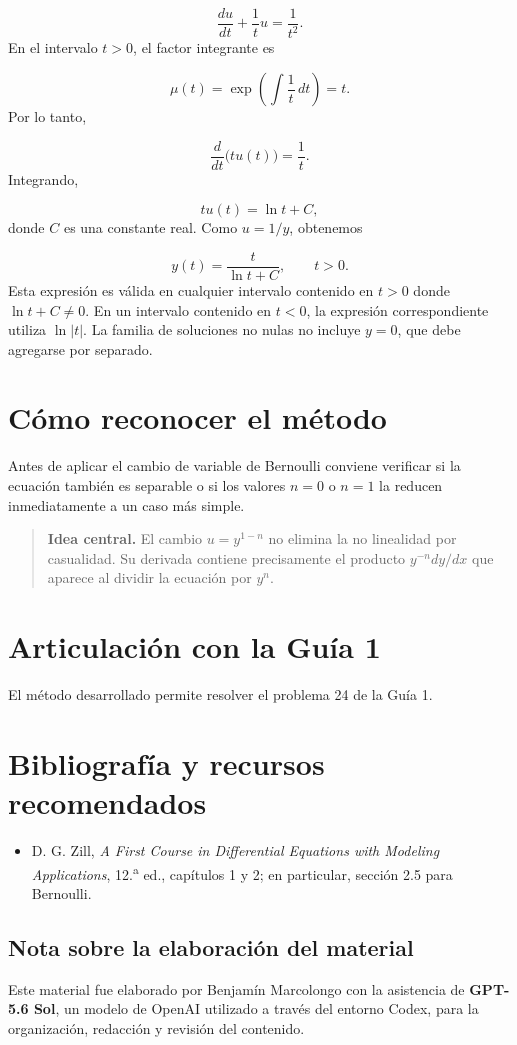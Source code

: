 \documentclass[12pt,a4paper]{article}
\begin{document}
	\[
	\frac{du}{dt}+\frac{1}{t}u=\frac{1}{t^2}.
	\]
	En el intervalo \(t>0\), el factor integrante es

	\[
	\mu(t)=\exp\left(\int\frac{1}{t}\,dt\right)=t.
	\]
	Por lo tanto,

	\[
	\frac{d}{dt}\bigl(tu(t)\bigr)=\frac{1}{t}.
	\]
	Integrando,

	\[
	tu(t)=\ln t+C,
	\]
	donde \(C\) es una constante real. Como \(u=1/y\), obtenemos

	\[
	\boxed{
	y(t)=\frac{t}{\ln t+C},
	\qquad t>0.
	}
	\]
	Esta expresión es válida en cualquier intervalo contenido en \(t>0\) donde \(\ln t+C\neq0\). En un intervalo contenido en \(t<0\), la expresión correspondiente utiliza \(\ln|t|\). La familia de soluciones no nulas no incluye \(y=0\), que debe agregarse por separado.

	\section{Cómo reconocer el método}

	Antes de aplicar el cambio de variable de Bernoulli conviene verificar si la ecuación también es separable o si los valores \(n=0\) o \(n=1\) la reducen inmediatamente a un caso más simple.

	\begin{quote}
		\textbf{Idea central.} El cambio \(u=y^{1-n}\) no elimina la no linealidad por casualidad. Su derivada contiene precisamente el producto \(y^{-n}dy/dx\) que aparece al dividir la ecuación por \(y^n\).
	\end{quote}

	\section*{Articulación con la Guía 1}

	El método desarrollado permite resolver el problema 24 de la Guía 1.

	\section*{Bibliografía y recursos recomendados}

	\begin{itemize}[leftmargin=*]
		\item D. G. Zill, \textit{A First Course in Differential Equations with Modeling Applications}, 12.\textsuperscript{a} ed., capítulos 1 y 2; en particular, sección 2.5 para Bernoulli.
	\end{itemize}

	\subsection*{Nota sobre la elaboración del material}

	Este material fue elaborado por Benjamín Marcolongo con la asistencia de \textbf{GPT-5.6 Sol}, un modelo de OpenAI utilizado a través del entorno Codex, para la organización, redacción y revisión del contenido.
\end{document}
